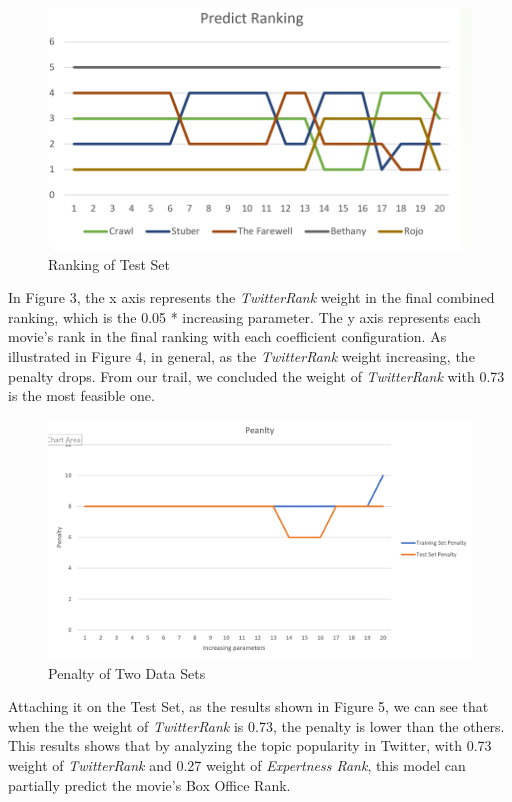 \documentclass[conference]{IEEEtran}
\theoremstyle{definition}
\begin{document}
\begin{figure}[htb]
	\centerline{\includegraphics[width=0.8\linewidth]{test_rank.png}}
	\caption{Ranking of Test Set}
	\label{fig}
\end{figure}

In Figure 3, the x axis represents the \textit{TwitterRank} weight in the final
combined ranking, which is the 0.05 * increasing parameter. The y axis
represents each movie's rank in the final ranking with each coefficient
configuration. As illustrated in Figure 4, in general, as the \textit{TwitterRank}
weight increasing, the penalty drops. From our trail, we concluded the weight of
\textit{TwitterRank} with 0.73 is the most feasible one.

\begin{figure}[htb]
	\centerline{\includegraphics[width=0.8\linewidth]{penalty.jpg}}
	\caption{Penalty of Two Data Sets}
	\label{fig}
\end{figure}



Attaching it on the Test Set, as the results shown in Figure 5, we can see that
when the the weight of \textit{TwitterRank} is 0.73, the penalty is lower than
the others. This results shows that by analyzing the topic popularity in
Twitter, with 0.73 weight of \textit{TwitterRank} and 0.27 weight of
\textit{Expertness Rank}, this model can partially predict the movie's Box Office Rank.
\end{document}
